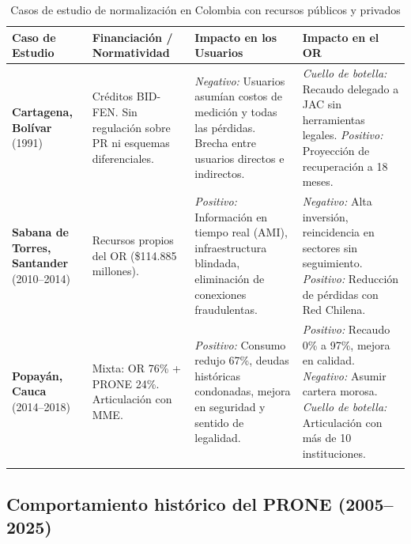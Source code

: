 \begin{table}[H]
\centering
\caption{Casos de estudio de normalización en Colombia con recursos públicos y privados}
\label{tab:casos_estudio}
\begin{tabularx}{\textwidth}{>{\RaggedRight}p{2.5cm}
                             >{\RaggedRight}p{2.8cm}
                             >{\RaggedRight}p{3.5cm}
                             >{\RaggedRight\arraybackslash}p{4.0cm}}
\toprule
\textbf{Caso de Estudio} & \textbf{Financiación / Normatividad} & \textbf{Impacto en los Usuarios} & \textbf{Impacto en el OR} \\
\midrule
\rowcolor{grisclaro}
\textbf{Cartagena, Bolívar} (1991)
& Créditos BID-FEN. Sin regulación sobre PR ni esquemas diferenciales.
& \textit{Negativo:} Usuarios asumían costos de medición y todas las pérdidas. Brecha entre usuarios directos e indirectos.
& \textit{Cuello de botella:} Recaudo delegado a JAC sin herramientas legales. \newline\textit{Positivo:} Proyección de recuperación a 18 meses. \\

\textbf{Sabana de Torres, Santander} (2010--2014)
& Recursos propios del OR (\$114.885 millones).
& \textit{Positivo:} Información en tiempo real (AMI), infraestructura blindada, eliminación de conexiones fraudulentas.
& \textit{Negativo:} Alta inversión, reincidencia en sectores sin seguimiento. \newline\textit{Positivo:} Reducción de pérdidas con Red Chilena. \\

\rowcolor{grisclaro}
\textbf{Popayán, Cauca} (2014--2018)
& Mixta: OR 76\% + PRONE 24\%. Articulación con MME.
& \textit{Positivo:} Consumo redujo 67\%, deudas históricas condonadas, mejora en seguridad y sentido de legalidad.
& \textit{Positivo:} Recaudo 0\% a 97\%, mejora en calidad. \newline\textit{Negativo:} Asumir cartera morosa. \newline\textit{Cuello de botella:} Articulación con más de 10 instituciones. \\
\bottomrule
\multicolumn{4}{l}{\footnotesize\textit{Fuente: Elaboración propia con datos de \parencite{CastilloQuintana1991, MendezFuentes2013, SerranoRueda2019}.}}
\end{tabularx}
\end{table}

\subsection{Comportamiento histórico del PRONE (2005--2025)}
\label{subsec:prone_historico}


